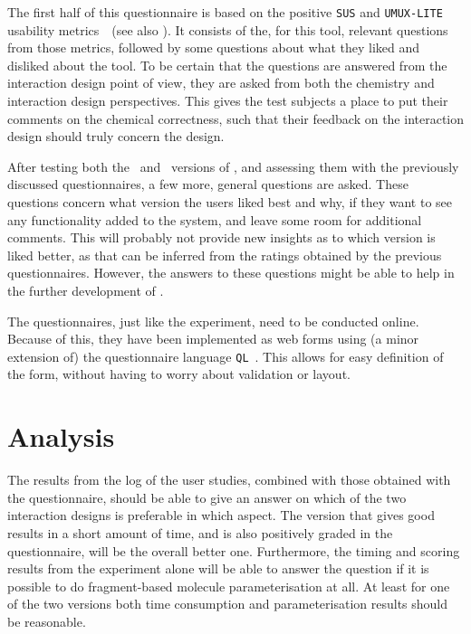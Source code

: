 The first half of this questionnaire is based on the positive \verb|SUS| and \verb|UMUX-LITE| usability metrics~\cite{lewis2013umux}~(see also ). It consists of the, for this tool, relevant questions from those metrics, followed by some questions about what they liked and disliked about the tool. To be certain that the questions are answered from the interaction design point of view, they are asked from both the chemistry and interaction design perspectives. This gives the test subjects a place to put their comments on the chemical correctness, such that their feedback on the interaction design should truly concern the design.

After testing both the \IDa\ and \IDb\ versions of \oframp, and assessing them with the previously discussed questionnaires, a few more, general questions are asked. These questions concern what version the users liked best and why, if they want to see any functionality added to the system, and leave some room for additional comments. This will probably not provide new insights as to which version is liked better, as that can be inferred from the ratings obtained by the previous questionnaires. However, the answers to these questions might be able to help in the further development of \oframp.

The questionnaires, just like the experiment, need to be conducted online. Because of this, they have been implemented as web forms using (a minor extension of) the questionnaire language \verb|QL|~\cite{erdweg2013state}. This allows for easy definition of the form, without having to worry about validation or layout.



\section{Analysis}
The results from the log of the user studies, combined with those obtained with the questionnaire, should be able to give an answer on which of the two interaction designs is preferable in which aspect. The version that gives good results in a short amount of time, and is also positively graded in the questionnaire, will be the overall better one. Furthermore, the timing and scoring results from the experiment alone will be able to answer the question if it is possible to do fragment-based molecule parameterisation at all. At least for one of the two versions both time consumption and parameterisation results should be reasonable.

